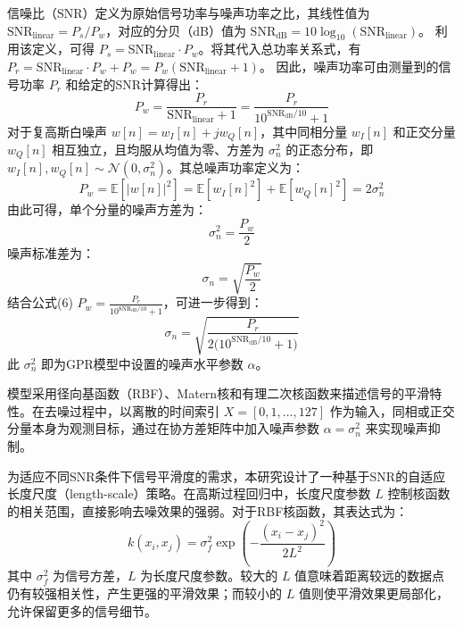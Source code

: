 \documentclass[conference]{IEEEtran}
\begin{document}
信噪比（SNR）定义为原始信号功率与噪声功率之比，其线性值为 $\mathrm{SNR}_{\text{linear}} = P_s/P_w$，对应的分贝（dB）值为 $\mathrm{SNR}_{\text{dB}} = 10\log_{10}(\mathrm{SNR}_{\text{linear}})$。
利用该定义，可得 $P_s = \mathrm{SNR}_{\text{linear}} \cdot P_w$。将其代入总功率关系式，有 $P_r = \mathrm{SNR}_{\text{linear}} \cdot P_w + P_w = P_w(\mathrm{SNR}_{\text{linear}} + 1)$。
因此，噪声功率可由测量到的信号功率 $P_r$ 和给定的SNR计算得出：
\begin{equation}
P_w = \frac{P_r}{\mathrm{SNR}_{\text{linear}} + 1} = \frac{P_r}{10^{\mathrm{SNR}_{\text{dB}}/10} + 1}
\end{equation}
对于复高斯白噪声 $w[n]=w_I[n]+jw_Q[n]$，其中同相分量 $w_I[n]$ 和正交分量 $w_Q[n]$ 相互独立，且均服从均值为零、方差为 $\sigma_n^2$ 的正态分布，即 $w_I[n],w_Q[n]\sim\mathcal{N}(0,\sigma_n^2)$。其总噪声功率定义为：
\begin{equation}
P_w=\mathbb{E}[|w[n]|^2]
=\mathbb{E}[w_I[n]^2]+\mathbb{E}[w_Q[n]^2]
=2\sigma_n^2
\end{equation}
由此可得，单个分量的噪声方差为：
\begin{equation}
\sigma_n^2=\frac{P_w}{2}
\end{equation}
噪声标准差为：
\begin{equation}
\sigma_n=\sqrt{\frac{P_w}{2}}
\end{equation}
结合公式(6) $P_w=\frac{P_r}{10^{\mathrm{SNR}_{\mathrm{dB}}/10}+1}$，可进一步得到：
\begin{equation}
\sigma_n=\sqrt{\frac{P_r}{2\bigl(10^{\mathrm{SNR}_{\mathrm{dB}}/10}+1\bigr)}}
\end{equation}
\label{eq:sigma_n_calc}
此 $\sigma_n^2$ 即为GPR模型中设置的噪声水平参数 $\alpha$。

模型采用径向基函数（RBF）、Matern核和有理二次核函数来描述信号的平滑特性。在去噪过程中，以离散的时间索引 $X=[0,1,\ldots,127]$ 作为输入，同相或正交分量本身为观测目标，通过在协方差矩阵中加入噪声参数 $\alpha=\sigma_n^2$ 来实现噪声抑制。

为适应不同SNR条件下信号平滑度的需求，本研究设计了一种基于SNR的自适应长度尺度（length-scale）策略。在高斯过程回归中，长度尺度参数 $L$ 控制核函数的相关范围，直接影响去噪效果的强弱。对于RBF核函数，其表达式为：
\begin{equation}
k(x_i, x_j) = \sigma_f^2 \exp\left(-\frac{(x_i - x_j)^2}{2L^2}\right)
\end{equation}
其中 $\sigma_f^2$ 为信号方差，$L$ 为长度尺度参数。较大的 $L$ 值意味着距离较远的数据点仍有较强相关性，产生更强的平滑效果；而较小的 $L$ 值则使平滑效果更局部化，允许保留更多的信号细节。
\end{document}

